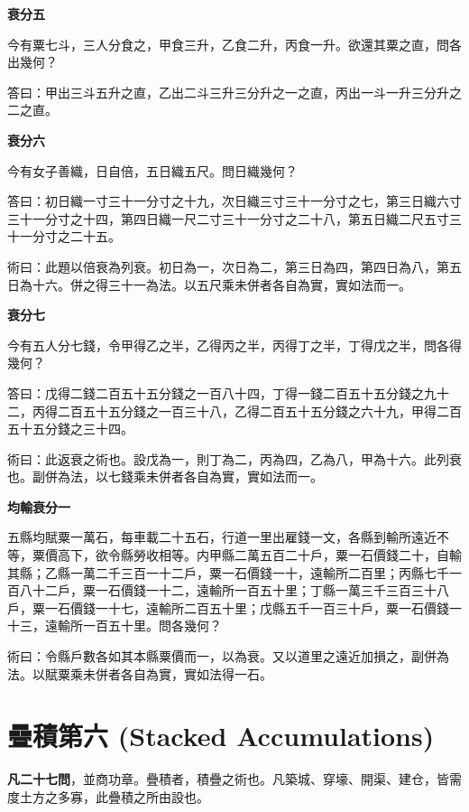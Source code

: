 \documentclass[11pt,a4paper]{article}
\newenvironment{problemenv}[1]{%
  \medskip\noindent\textbf{#1}\par\nopagebreak\smallskip
}{\medskip}
\begin{document}
\begin{problemenv}{衰分五}
今有粟七斗，三人分食之，甲食三升，乙食二升，丙食一升。欲還其粟之直，問各出幾何？

\textsf{答曰：}甲出三斗五升之直，乙出二斗三升三分升之一之直，丙出一斗一升三分升之二之直。
\end{problemenv}

\begin{problemenv}{衰分六}
今有女子善織，日自倍，五日織五尺。問日織幾何？

\textsf{答曰：}初日織一寸三十一分寸之十九，次日織三寸三十一分寸之七，第三日織六寸三十一分寸之十四，第四日織一尺二寸三十一分寸之二十八，第五日織二尺五寸三十一分寸之二十五。

\textsf{術曰：}此題以倍衰為列衰。初日為一，次日為二，第三日為四，第四日為八，第五日為十六。併之得三十一為法。以五尺乘未併者各自為實，實如法而一。
\end{problemenv}

\begin{problemenv}{衰分七}
今有五人分七錢，令甲得乙之半，乙得丙之半，丙得丁之半，丁得戊之半，問各得幾何？

\textsf{答曰：}戊得二錢二百五十五分錢之一百八十四，丁得一錢二百五十五分錢之九十二，丙得二百五十五分錢之一百三十八，乙得二百五十五分錢之六十九，甲得二百五十五分錢之三十四。

\textsf{術曰：}此返衰之術也。設戊為一，則丁為二，丙為四，乙為八，甲為十六。此列衰也。副併為法，以七錢乘未併者各自為實，實如法而一。
\end{problemenv}

\begin{problemenv}{均輸衰分一}
五縣均賦粟一萬石，每車載二十五石，行道一里出雇錢一文，各縣到輸所遠近不等，粟價高下，欲令縣勞收相等。内甲縣二萬五百二十戶，粟一石價錢二十，自輸其縣；乙縣一萬二千三百一十二戶，粟一石價錢一十，遠輸所二百里；丙縣七千一百八十二戶，粟一石價錢一十二，遠輸所一百五十里；丁縣一萬三千三百三十八戶，粟一石價錢一十七，遠輸所二百五十里；戊縣五千一百三十戶，粟一石價錢一十三，遠輸所一百五十里。問各幾何？

\textsf{術曰：}令縣戶數各如其本縣粟價而一，以為衰。又以道里之遠近加損之，副併為法。以賦粟乘未併者各自為實，實如法得一石。
\end{problemenv}

\newpage
\section{疊積第六 (Stacked Accumulations)}

\textbf{凡二十七問}，並商功章。疊積者，積疊之術也。凡築城、穿壕、開渠、建仓，皆需度土方之多寡，此疊積之所由設也。
\end{document}

